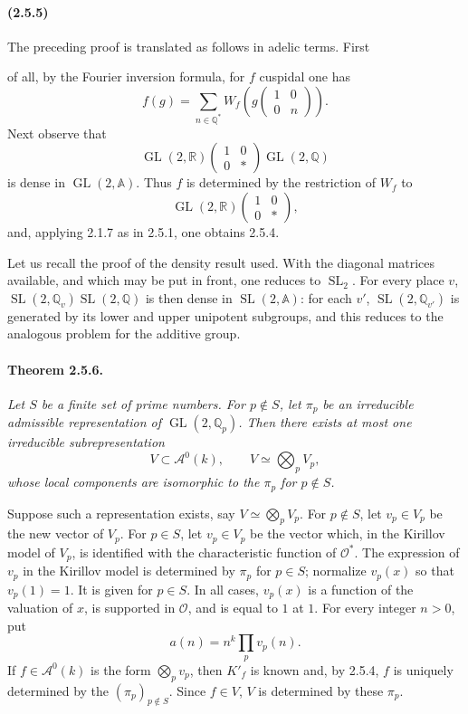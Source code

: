 \documentclass[10pt,a4paper]{article}
\providecommand{\GL}{\operatorname{GL}}
\providecommand{\SL}{\operatorname{SL}}
\providecommand{\R}{\mathbb R}
\providecommand{\Q}{\mathbb Q}
\providecommand{\A}{\mathbb A}
\providecommand{\OO}{\mathcal O}
\begin{document}
\paragraph{(2.5.5)} The preceding proof is translated as follows in adelic terms. First

\clearpage
{}
\hypertarget{authority-36}{}
of all, by the Fourier inversion formula, for \(f\) cuspidal one has
\[
\tag{2.5.5.1}
f(g)=\sum_{n\in\Q^*}W_f\!\left(g\begin{pmatrix}1&0\\0&n\end{pmatrix}\right).
\]
Next observe that
\[
\GL(2,\R)\begin{pmatrix}1&0\\0&*\end{pmatrix}\GL(2,\Q)
\]
is dense in \(\GL(2,\A)\). Thus \(f\) is determined by the restriction of \(W_f\) to
\[
\GL(2,\R)\begin{pmatrix}1&0\\0&*\end{pmatrix},
\]
and, applying 2.1.7 as in 2.5.1, one obtains 2.5.4.

Let us recall the proof of the density result used. With the diagonal matrices available, and which may be put in front, one reduces to \(\SL_2\). For every place \(v\), \(\SL(2,\Q_v)\SL(2,\Q)\) is then dense in \(\SL(2,\A)\): for each \(v'\), \(\SL(2,\Q_{v'})\) is generated by its lower and upper unipotent subgroups, and this reduces to the analogous problem for the additive group.

\paragraph{Theorem 2.5.6.}{\itshape  Let \(S\) be a finite set of prime numbers. For \(p\notin S\), let \(\pi_p\) be an irreducible admissible representation of \(\GL(2,\Q_p)\). Then there exists at most one irreducible subrepresentation
\[
V\subset \mathcal A^0(k),\qquad V\simeq\bigotimes_p V_p,
\]
whose local components are isomorphic to the \(\pi_p\) for \(p\notin S\).\par}

Suppose such a representation exists, say \(V\simeq\bigotimes_pV_p\). For \(p\notin S\), let \(v_p\in V_p\) be the new vector of \(V_p\). For \(p\in S\), let \(v_p\in V_p\) be the vector which, in the Kirillov model of \(V_p\), is identified with the characteristic function of \(\OO^*\). The expression of \(v_p\) in the Kirillov model is determined by \(\pi_p\) for \(p\in S\); normalize \(v_p(x)\) so that \(v_p(1)=1\). It is given for \(p\in S\). In all cases, \(v_p(x)\) is a function of the valuation of \(x\), is supported in \(\OO\), and is equal to \(1\) at \(1\). For every integer \(n>0\), put
\[
a(n)=n^k\prod_p v_p(n).
\]
If \(f\in \mathcal A^0(k)\) is the form \(\bigotimes_pv_p\), then \(K'_f\) is known and, by 2.5.4, \(f\) is uniquely determined by the \((\pi_p)_{p\notin S}\). Since \(f\in V\), \(V\) is determined by these \(\pi_p\).
\end{document}
